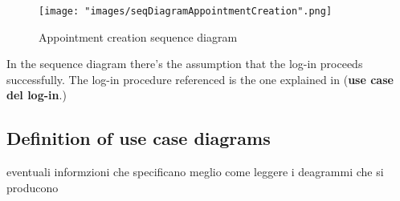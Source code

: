\begin{figure}[H]
\begin{center}
\texttt{[image: "images/seqDiagramAppointmentCreation".png]}
\caption{Appointment creation sequence diagram}
\label{img:seqDiagrAppCreation}
\end{center}
\end{figure}

In the sequence diagram there's the assumption that the log-in proceeds successfully. The log-in procedure referenced is the one explained in (\textbf{use case del log-in}.)

\subsection{Definition of use case diagrams}
eventuali informzioni che specificano meglio come leggere i deagrammi che si producono
